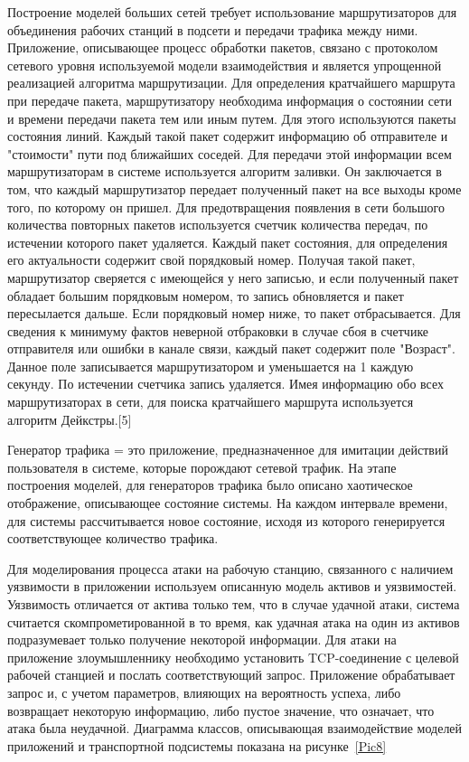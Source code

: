     Построение моделей больших сетей требует использование маршрутизаторов для объединения рабочих станций в подсети и передачи трафика между ними. Приложение, описывающее процесс обработки пакетов, связано с протоколом сетевого уровня используемой модели взаимодействия и является упрощенной реализацией алгоритма маршрутизации. Для определения кратчайшего маршрута при передаче пакета, маршрутизатору необходима информация о состоянии сети и времени передачи пакета тем или иным путем. Для этого используются пакеты состояния линий. Каждый такой пакет содержит информацию об отправителе и "стоимости" пути под ближайших соседей. Для передачи этой информации всем маршрутизаторам в системе  используется алгоритм заливки. Он заключается в том, что каждый маршрутизатор передает полученный пакет на все выходы кроме того, по которому он пришел. Для предотвращения появления в сети большого количества повторных пакетов используется счетчик количества передач, по истечении которого пакет удаляется. Каждый пакет состояния, для определения его актуальности содержит свой порядковый номер. Получая такой пакет, маршрутизатор сверяется с имеющейся у него записью, и если полученный пакет обладает большим порядковым номером, то запись обновляется и пакет пересылается дальше. Если порядковый номер ниже, то пакет отбрасывается. Для сведения к минимуму фактов неверной отбраковки в случае сбоя в счетчике отправителя или ошибки в канале связи, каждый пакет содержит поле "Возраст". Данное поле записывается маршрутизатором и уменьшается на 1 каждую секунду. По истечении счетчика запись удаляется. Имея информацию обо всех маршрутизаторах в сети, для поиска кратчайшего маршрута используется алгоритм Дейкстры.[5]

    Генератор трафика = это приложение, предназначенное для имитации действий пользователя в системе, которые порождают сетевой трафик. На этапе построения моделей, для генераторов трафика было описано хаотическое отображение, описывающее состояние системы. На каждом интервале времени, для системы рассчитывается новое состояние, исходя из которого генерируется соответствующее количество трафика.

    Для моделирования процесса атаки на рабочую станцию, связанного с наличием уязвимости в приложении используем описанную модель активов и уязвимостей. Уязвимость отличается от актива только тем, что в случае удачной атаки, система считается скомпрометированной в то время, как удачная атака на один из активов подразумевает только получение некоторой информации. Для атаки на приложение злоумышленнику необходимо установить TCP-соединение с целевой рабочей станцией и послать соответствующий запрос. Приложение обрабатывает запрос и, с учетом параметров, влияющих на вероятность успеха, либо возвращает некоторую информацию, либо пустое значение, что означает, что атака была неудачной. Диаграмма классов, описывающая взаимодействие моделей приложений и транспортной подсистемы показана на рисунке~\ref{Pic8}

